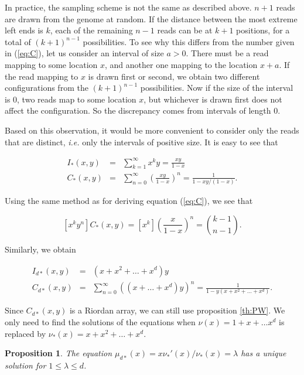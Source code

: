 \documentclass{article}
\newtheorem{proposition}{Proposition}
\begin{document}
In practice, the sampling scheme is not the same as described above.
$n+1$ reads are drawn from the genome at random. If the distance between
the most extreme left ends is $k$, each of the remaining $n-1$ reads can
be at $k+1$ positions, for a total of $(k+1)^{n-1}$ possibilities. To see
why this differs from the number given in (\ref{eq:C}), let us consider an
interval of size $a > 0$. There must be a read mapping to some location
$x$, and another one mapping to the location $x+a$. If the read mapping to
$x$ is drawn first or second, we obtain two different configurations from
the $(k+1)^{n-1}$ possibilities. Now if the size of the interval is 0, two
reads map to some location $x$, but whichever is drawn first does not
affect the configuration. So the discrepancy comes from intervals of
length 0.

Based on this observation, it would be more convenient to consider only
the reads that are distinct, \textit{i.e.} only the intervals of positive
size. It is easy to see that

\begin{eqnarray*}
I_*(x,y) &=& \sum_{k=1}^\infty x^ky = \frac{xy}{1-x} \\
C_*(x,y) &=& \sum_{n=0}^\infty \left( \frac{xy}{1-x} \right)^n
= \frac{1}{1-xy/(1-x)}.
\end{eqnarray*}

Using the same method as for deriving equation (\ref{eq:C}), we see that 

\begin{equation}
\label{eq:Cstar}
[x^ky^n]C_*(x,y) = [x^k] \left( \frac{x}{1-x} \right)^n
= {k-1 \choose n-1}.
\end{equation}

Similarly, we obtain 

\begin{eqnarray*}
I_{d*}(x,y) &=& (x + x^2 + \ldots + x^d)y \\
C_{d*}(x,y) &=& \sum_{n=0}^\infty \left((x+ \ldots + x^d)y
\right)^n
= \frac{1}{1-y(x+x^2+\ldots+x^d)}.
\end{eqnarray*}

Since $C_{d*}(x,y)$ is a Riordan array, we can still use proposition
\ref{th:PW}. We only need to find the solutions of the equations when
$\nu(x) = 1+ x+ \ldots x^d$ is replaced by $\nu_*(x) = x+x^2+\ldots +x^d$.

\begin{proposition}
The equation $\mu_{d*}(x) = x\nu_*'(x)/\nu_*(x) = \lambda$ has a unique
solution for $1 \leq \lambda \leq d$.
\end{proposition}
\end{document}
